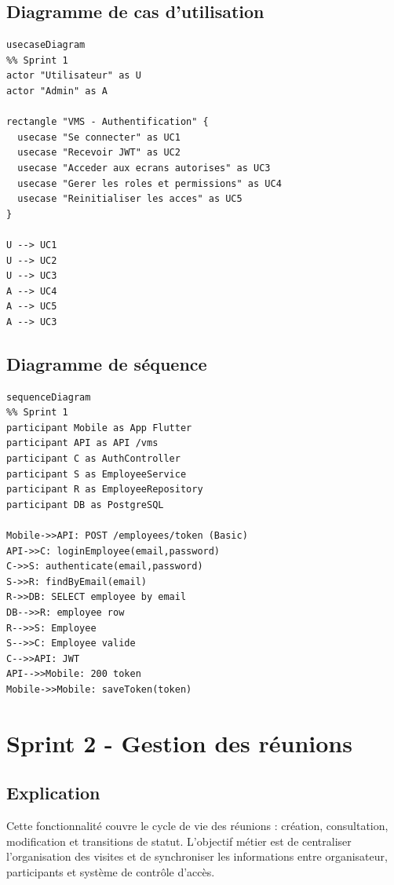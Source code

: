 \documentclass[12pt,a4paper]{article}
\begin{document}
\subsection*{Diagramme de cas d’utilisation}
\begin{verbatim}
usecaseDiagram
%% Sprint 1
actor "Utilisateur" as U
actor "Admin" as A

rectangle "VMS - Authentification" {
  usecase "Se connecter" as UC1
  usecase "Recevoir JWT" as UC2
  usecase "Acceder aux ecrans autorises" as UC3
  usecase "Gerer les roles et permissions" as UC4
  usecase "Reinitialiser les acces" as UC5
}

U --> UC1
U --> UC2
U --> UC3
A --> UC4
A --> UC5
A --> UC3
\end{verbatim}

\subsection*{Diagramme de séquence}
\begin{verbatim}
sequenceDiagram
%% Sprint 1
participant Mobile as App Flutter
participant API as API /vms
participant C as AuthController
participant S as EmployeeService
participant R as EmployeeRepository
participant DB as PostgreSQL

Mobile->>API: POST /employees/token (Basic)
API->>C: loginEmployee(email,password)
C->>S: authenticate(email,password)
S->>R: findByEmail(email)
R->>DB: SELECT employee by email
DB-->>R: employee row
R-->>S: Employee
S-->>C: Employee valide
C-->>API: JWT
API-->>Mobile: 200 token
Mobile->>Mobile: saveToken(token)
\end{verbatim}

\section*{Sprint 2 - Gestion des réunions}
\subsection*{Explication}
Cette fonctionnalité couvre le cycle de vie des réunions : création, consultation, modification et transitions de statut. L’objectif métier est de centraliser l’organisation des visites et de synchroniser les informations entre organisateur, participants et système de contrôle d’accès.
\end{document}
